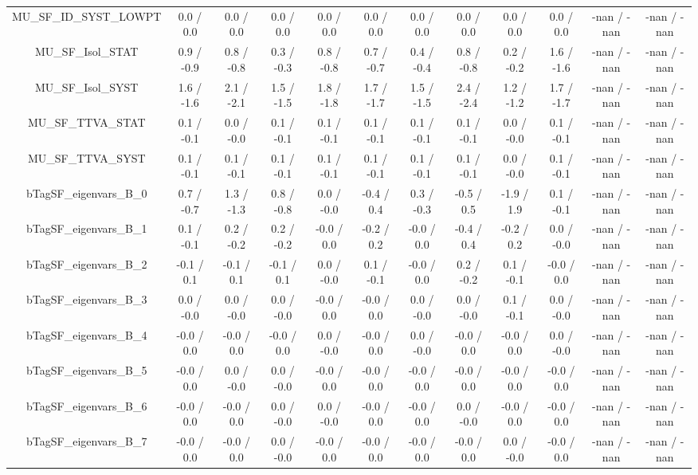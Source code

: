 \begin{table}[htbp]
\begin{center}
\begin{tabular}{|c|c|c|c|c|c|c|c|c|c|c|c|}
  MU_SF_ID_SYST_LOWPT & 0.0 / 0.0 & 0.0 / 0.0 & 0.0 / 0.0 & 0.0 / 0.0 & 0.0 / 0.0 & 0.0 / 0.0 & 0.0 / 0.0 & 0.0 / 0.0 & 0.0 / 0.0 & -nan / -nan & -nan / -nan \\ 
  MU_SF_Isol_STAT & 0.9 / -0.9 & 0.8 / -0.8 & 0.3 / -0.3 & 0.8 / -0.8 & 0.7 / -0.7 & 0.4 / -0.4 & 0.8 / -0.8 & 0.2 / -0.2 & 1.6 / -1.6 & -nan / -nan & -nan / -nan \\ 
  MU_SF_Isol_SYST & 1.6 / -1.6 & 2.1 / -2.1 & 1.5 / -1.5 & 1.8 / -1.8 & 1.7 / -1.7 & 1.5 / -1.5 & 2.4 / -2.4 & 1.2 / -1.2 & 1.7 / -1.7 & -nan / -nan & -nan / -nan \\ 
  MU_SF_TTVA_STAT & 0.1 / -0.1 & 0.0 / -0.0 & 0.1 / -0.1 & 0.1 / -0.1 & 0.1 / -0.1 & 0.1 / -0.1 & 0.1 / -0.1 & 0.0 / -0.0 & 0.1 / -0.1 & -nan / -nan & -nan / -nan \\ 
  MU_SF_TTVA_SYST & 0.1 / -0.1 & 0.1 / -0.1 & 0.1 / -0.1 & 0.1 / -0.1 & 0.1 / -0.1 & 0.1 / -0.1 & 0.1 / -0.1 & 0.0 / -0.0 & 0.1 / -0.1 & -nan / -nan & -nan / -nan \\ 
  bTagSF_eigenvars_B_0 & 0.7 / -0.7 & 1.3 / -1.3 & 0.8 / -0.8 & 0.0 / -0.0 & -0.4 / 0.4 & 0.3 / -0.3 & -0.5 / 0.5 & -1.9 / 1.9 & 0.1 / -0.1 & -nan / -nan & -nan / -nan \\ 
  bTagSF_eigenvars_B_1 & 0.1 / -0.1 & 0.2 / -0.2 & 0.2 / -0.2 & -0.0 / 0.0 & -0.2 / 0.2 & -0.0 / 0.0 & -0.4 / 0.4 & -0.2 / 0.2 & 0.0 / -0.0 & -nan / -nan & -nan / -nan \\ 
  bTagSF_eigenvars_B_2 & -0.1 / 0.1 & -0.1 / 0.1 & -0.1 / 0.1 & 0.0 / -0.0 & 0.1 / -0.1 & -0.0 / 0.0 & 0.2 / -0.2 & 0.1 / -0.1 & -0.0 / 0.0 & -nan / -nan & -nan / -nan \\ 
  bTagSF_eigenvars_B_3 & 0.0 / -0.0 & 0.0 / -0.0 & 0.0 / -0.0 & -0.0 / 0.0 & -0.0 / 0.0 & 0.0 / -0.0 & 0.0 / -0.0 & 0.1 / -0.1 & 0.0 / -0.0 & -nan / -nan & -nan / -nan \\ 
  bTagSF_eigenvars_B_4 & -0.0 / 0.0 & -0.0 / 0.0 & -0.0 / 0.0 & 0.0 / -0.0 & -0.0 / 0.0 & 0.0 / -0.0 & -0.0 / 0.0 & -0.0 / 0.0 & 0.0 / -0.0 & -nan / -nan & -nan / -nan \\ 
  bTagSF_eigenvars_B_5 & -0.0 / 0.0 & 0.0 / -0.0 & 0.0 / -0.0 & -0.0 / 0.0 & -0.0 / 0.0 & -0.0 / 0.0 & -0.0 / 0.0 & -0.0 / 0.0 & -0.0 / 0.0 & -nan / -nan & -nan / -nan \\ 
  bTagSF_eigenvars_B_6 & -0.0 / 0.0 & -0.0 / 0.0 & 0.0 / -0.0 & 0.0 / -0.0 & -0.0 / 0.0 & -0.0 / 0.0 & 0.0 / -0.0 & -0.0 / 0.0 & -0.0 / 0.0 & -nan / -nan & -nan / -nan \\ 
  bTagSF_eigenvars_B_7 & -0.0 / 0.0 & -0.0 / 0.0 & 0.0 / -0.0 & -0.0 / 0.0 & -0.0 / 0.0 & -0.0 / 0.0 & -0.0 / 0.0 & 0.0 / -0.0 & -0.0 / 0.0 & -nan / -nan & -nan / -nan \\ 

\end{tabular}
\end{center}
\end{table}
